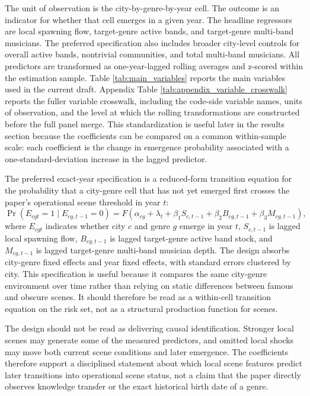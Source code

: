 The unit of observation is the city-by-genre-by-year cell. The outcome is an indicator for whether
that cell emerges in a given year. The headline regressors are local spawning flow, target-genre
active bands, and target-genre multi-band musicians. The preferred specification also includes
broader city-level controls for overall active bands, nontrivial communities, and total multi-band
musicians. All predictors are transformed as one-year-lagged rolling averages and z-scored within
the estimation sample. Table \ref{tab:main_variables} reports the main variables used in the
current draft. Appendix Table \ref{tab:appendix_variable_crosswalk} reports the fuller variable
crosswalk, including the code-side variable names, units of observation, and the level at which
the rolling transformations are constructed before the full panel merge. This standardization is
useful later in the results section because the coefficients can be compared on a common
within-sample scale: each coefficient is the change in emergence probability associated with a
one-standard-deviation increase in the lagged predictor.



The preferred exact-year specification is a reduced-form transition equation for the probability
that a city-genre cell that has not yet emerged first crosses the paper's operational scene
threshold in year $t$:
\[
\Pr(E_{cgt}=1 \mid E_{cg,t-1}=0) = F\left(\alpha_{cg} + \lambda_t + \beta_1 S_{c,t-1}
 + \beta_2 B_{cg,t-1} + \beta_3 M_{cg,t-1}\right),
\]
where $E_{cgt}$ indicates whether city $c$ and genre $g$ emerge in year $t$, $S_{c,t-1}$ is
lagged local spawning flow, $B_{cg,t-1}$ is lagged target-genre active band stock, and
$M_{cg,t-1}$ is lagged target-genre multi-band musician depth. The design absorbs city-genre fixed
effects and year fixed effects, with standard errors clustered by city. This specification is
useful because it compares the same city-genre environment over time rather than relying on static
differences between famous and obscure scenes. It should therefore be read as a within-cell
transition equation on the risk set, not as a structural production function for scenes.

The design should not be read as delivering causal identification. Stronger local scenes may
generate some of the measured predictors, and omitted local shocks may move both current scene
conditions and later emergence. The coefficients therefore support a disciplined statement about
which local scene features predict later transitions into operational scene status, not a claim
that the paper directly observes knowledge transfer or the exact historical birth date of a genre.
